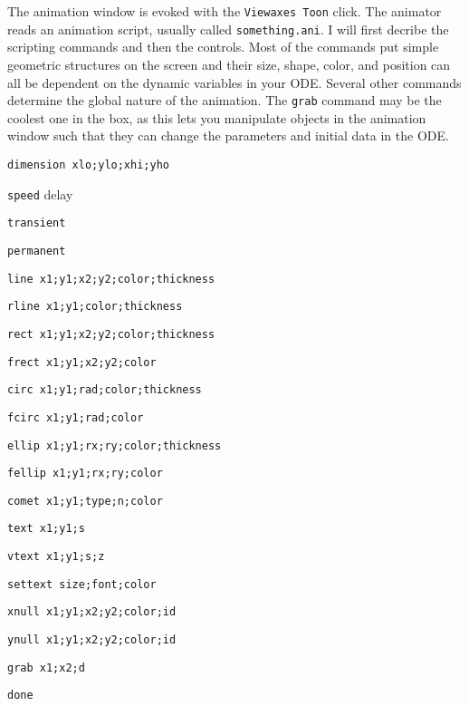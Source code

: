 \documentclass{article}
\begin{document}
\begin{itemize}
\end{itemize}

\bigskip
{}

The animation window is evoked with the {\tt Viewaxes Toon} click. The animator reads an animation script, usually called {\tt something.ani}. I will first decribe the scripting commands and then the controls. Most of the commands put simple geometric structures on the screen and their size, shape, color, and position can all be dependent on the dynamic variables in your ODE. Several other commands determine the global nature of the animation. The {\tt grab} command may be the coolest one in the box, as this lets you manipulate objects in the animation window such that they can change the parameters and initial data in the ODE. 


\begin{description}
\item{\tt dimension xlo;ylo;xhi;yho}
\item{\tt speed} delay
\item{\tt transient}
\item{\tt permanent}
\item{\tt line x1;y1;x2;y2;color;thickness}
\item{\tt rline x1;y1;color;thickness}
\item{\tt rect x1;y1;x2;y2;color;thickness}
\item{\tt frect x1;y1;x2;y2;color}
\item{\tt circ x1;y1;rad;color;thickness}
\item{\tt fcirc x1;y1;rad;color}
\item{\tt ellip x1;y1;rx;ry;color;thickness}
\item{\tt fellip x1;y1;rx;ry;color}
\item{\tt comet x1;y1;type;n;color}
\item{\tt text x1;y1;s}
\item{\tt vtext x1;y1;s;z}
\item{\tt settext size;font;color}
\item{\tt xnull x1;y1;x2;y2;color;id}
\item{\tt ynull x1;y1;x2;y2;color;id}
\item{\tt grab x1;x2;d}


\item{\tt done}
\end{description}
\end{document}
